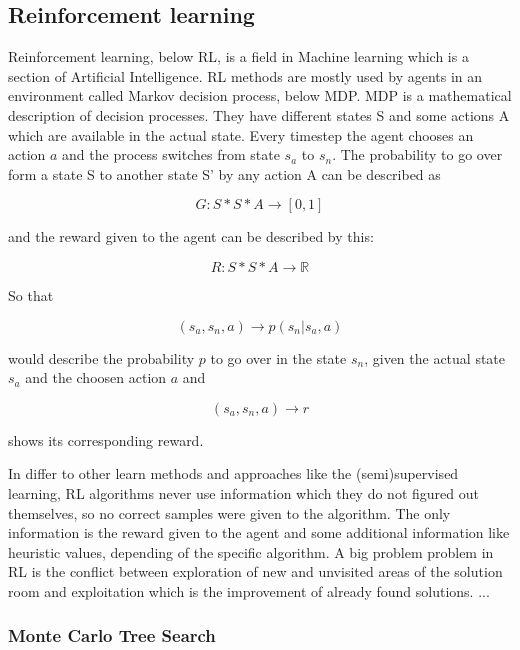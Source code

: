 \subsection{Reinforcement learning} 
 
Reinforcement learning, below RL, is a field in Machine learning which is a section of Artificial Intelligence. RL methods are mostly used by agents in an environment called Markov decision process, below MDP. MDP is a mathematical description of decision processes. They have different states S and some actions A which are available in the actual state. Every timestep the agent chooses an action $a$ and the process switches from state $s_a$ to $s_n$. The probability to go over form a state S to another state S' by any action A can be described as

\begin{equation}
	G: S*S*A \rightarrow [0,1] 
\end{equation}

and the reward given to the agent can be described by this:

\begin{equation}
	R: S*S*A \rightarrow \mathbb{R}
\end{equation}

So that

\begin{equation}
	(s_a, s_n, a) \rightarrow p(s_n|s_a, a)
\end{equation}

would describe the probability $p$ to go over in the state $s_n$, given the actual state $s_a$ and the choosen action $a$ and 

\begin{equation}
	(s_a, s_n, a) \rightarrow r
\end{equation}

shows its corresponding reward.  


In differ to other learn methods and approaches like the (semi)supervised learning, RL algorithms never use information which they do not figured out themselves, so no correct samples were given to the algorithm. The only information is the reward given to the agent and some additional information like heuristic values, depending of the specific algorithm. 
A big problem problem in RL is the conflict between exploration of new and unvisited areas of the solution room and exploitation which is the improvement of already found solutions.
...
\subsubsection{Monte Carlo Tree Search} 

